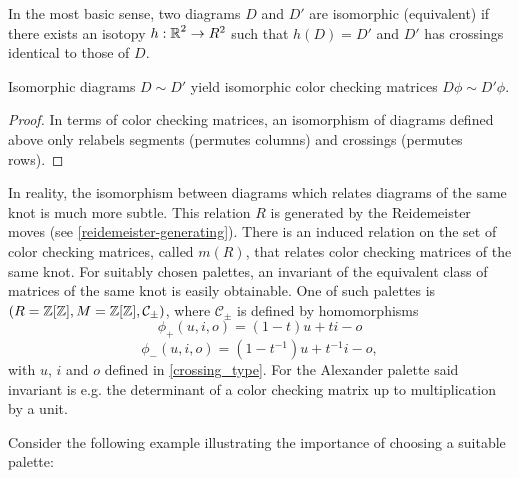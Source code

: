 In the most basic sense, two diagrams $D$ and $D'$ are isomorphic (equivalent) if there exists an isotopy $h:\operatorname{\mathbb{R}}^2\to R^2$ such that $h(D)=D'$ and $D'$ has crossings identical to those of $D$.

\begin{lemma}
  Isomorphic diagrams $D\sim D'$ yield isomorphic color checking matrices $D\phi\sim D'\phi$.
\end{lemma}

\begin{proof}
  In terms of color checking matrices, an isomorphism of diagrams defined above only relabels segments (permutes columns) and crossings (permutes rows).
\end{proof}

In reality, the isomorphism between diagrams which relates diagrams of the same knot is much more subtle. This relation $R$ is generated by the Reidemeister moves (see \cref{reidemeister-generating}). There is an induced relation on the set of color checking matrices, called $m(R)$, that relates color checking matrices of the same knot. For suitably chosen palettes, an invariant of the equivalent class of matrices of the same knot is easily obtainable. One of such palettes is  {\boldmath$(R=\operatorname{\mathbb{Z}}[\operatorname{\mathbb{Z}}], M=\operatorname{\mathbb{Z}}[\operatorname{\mathbb{Z}}], \mathcal{C}_\pm)$}, where $\mathcal{C}_\pm$ is defined by homomorphisms
$$\phi_+(u,i,o)=(1-t)u+ti-o$$
$$\phi_-(u,i,o)=(1-t^{-1})u+t^{-1}i-o,$$
with $u$, $i$ and $o$ defined in \cref{crossing_type}. For the Alexander palette said invariant is e.g. the determinant of a color checking matrix up to multiplication by a unit. 

Consider the following example illustrating the importance of choosing a suitable palette:


